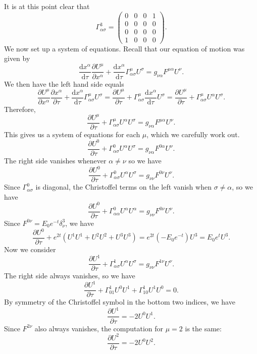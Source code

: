 \documentclass[11pt, letterpaper]{article}
\theoremstyle{plain}
\begin{document}
It is at this point clear that
\[
	\Gamma^3_{\alpha \sigma } =\begin{pmatrix}
	0 & 0 & 0 & 1 \\
	0 & 0 & 0 & 0 \\
	0 & 0 & 0 & 0 \\
	1 & 0 & 0 & 0
	\end{pmatrix}
.\]
We now set up a system of equations. Recall that our equation of motion was given by
\[
	\frac{\mathrm{d}x^\alpha }{\mathrm{d}\tau } \frac{\partial U^\mu }{\partial x^\alpha } +\frac{\mathrm{d}x^\alpha }{\mathrm{d}\tau } \Gamma ^\mu _{\alpha \sigma } U^\sigma =g_{\nu \alpha } F^{\mu \alpha } U^\nu 
.\]
We then have the left hand side equals
\[
	\frac{\partial U^\mu }{\partial x^\alpha } \frac{\partial x^\alpha }{\partial \tau } +\frac{\mathrm{d}x^\alpha }{\mathrm{d}\tau } \Gamma _{\alpha \sigma } ^\mu U^\sigma =\frac{\partial U^\mu }{\partial \tau } +\Gamma _{\alpha \sigma } ^\mu \frac{\mathrm{d}x^\alpha }{\mathrm{d}\tau } U^\sigma =\frac{\partial U^\mu }{\partial \tau } +\Gamma _{\alpha \sigma } ^\mu U^\alpha U^\sigma 
.\]
Therefore,
\[
	\frac{\partial U^\mu }{\partial \tau } +\Gamma ^\mu _{\alpha \sigma } U^\alpha U^\sigma =g_{\nu \alpha } F^{\mu \alpha } U^\nu 
.\]
This gives us a system of equations for each $\mu $, which we carefully work out.
\[
	\frac{\partial U^0}{\partial \tau } +\Gamma ^0_{\alpha \sigma } U^\alpha U^\sigma =g_{\nu \alpha } F^{0\alpha } U^\nu 
.\]
The right side vanishes whenever $\alpha \neq \nu $ so we have
\[
	\frac{\partial U^0}{\partial \tau } +\Gamma ^0_{\alpha \sigma } U^\alpha U^\sigma =g_{\nu \nu } F^{0\nu } U^\nu 
.\]
Since $\Gamma ^0_{\alpha \sigma } $ is diagonal, the Christoffel terms on the left vanish when $\sigma \neq \alpha $, so we have
\[
	\frac{\partial U^0}{\partial \tau } +\Gamma ^0_{\alpha \alpha } U^\alpha U^\alpha  =g_{\nu \nu } F^{0\nu } U^\nu 
.\]
Since $F^{0\nu } =E_0e^{-t} \delta^3_\nu $, we have
\[
	\frac{\partial U^0}{\partial \tau } +e^{2t} \left( U^1U^1+U^2U^2+U^3U^3 \right) =e^{2t} (-E_0e^{-t} )U^3=E_0e^{t} U^3
.\]
Now we consider
\[
	\frac{\partial U^1}{\partial \tau } +\Gamma ^1_{\alpha \sigma } U^\alpha U^\sigma =g_{\nu \nu } F^{1\nu } U^\nu 
.\]
The right side always vanishes, so we have
\[
	\frac{\partial U^1}{\partial \tau } +\Gamma^1_{01} U^0U^1+\Gamma ^1_{10} U^1U^0=0
.\]
By symmetry of the Christoffel symbol in the bottom two indices, we have
\[
	\frac{\partial U^1}{\partial \tau } =-2U^0U^1
.\]
Since $F^{2\nu } $ also always vanishes, the computation for $\mu =2$ is the same:
\[
	\frac{\partial U^2}{\partial \tau } =-2U^0U^2
.\]
\end{document}
